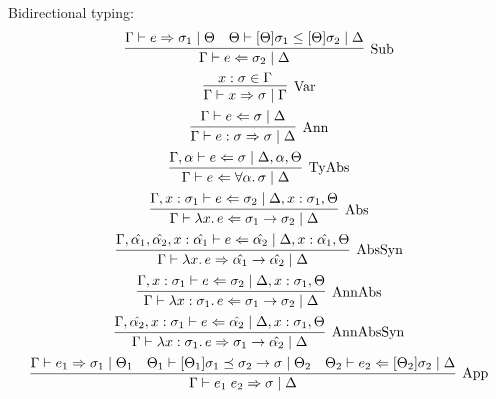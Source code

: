 Bidirectional typing:
\begin{gather*}
  \infer[\text{Sub}]{\Gamma \vdash e \Leftarrow \sigma_2 \mid \Delta}{
    \Gamma \vdash e \Rightarrow \sigma_1 \mid \Theta
    &
    \Theta \vdash [\Theta]\sigma_1 \leq [\Theta]\sigma_2 \mid \Delta
  }
  \\
  \infer[\text{Var}]{\Gamma \vdash x \Rightarrow \sigma \mid \Gamma}{
    x: \sigma \in \Gamma
  }
  \\
  \infer[\text{Ann}]{\Gamma \vdash e: \sigma \Rightarrow \sigma \mid \Delta}{
    \Gamma \vdash e \Leftarrow \sigma \mid \Delta
  }
  \\
  \infer[\text{TyAbs}]{\Gamma \vdash e \Leftarrow \forall \alpha\ldotp \sigma \mid \Delta}{
    \Gamma,\alpha \vdash e \Leftarrow \sigma \mid \Delta, \alpha, \Theta
  }
  \\
  \infer[\text{Abs}]{\Gamma \vdash \lambda x\ldotp e \Leftarrow \sigma_1 \to \sigma_2 \mid \Delta}{
    \Gamma, x: \sigma_1 \vdash e \Leftarrow \sigma_2 \mid \Delta, x: \sigma_1, \Theta
  }
  \\
  \infer[\text{AbsSyn}]{\Gamma \vdash \lambda x\ldotp e \Rightarrow \hat{\alpha_1} \to \hat{\alpha_2} \mid \Delta}{
    \Gamma, \hat{\alpha_1}, \hat{\alpha_2}, x: \hat{\alpha_1} \vdash e \Leftarrow \hat{\alpha_2} \mid \Delta, x: \hat{\alpha_1}, \Theta
  }
  \\
  \infer[\text{AnnAbs}]{\Gamma \vdash \lambda x: \sigma_1\ldotp e \Leftarrow \sigma_1 \to \sigma_2 \mid \Delta}{
    \Gamma, x: \sigma_1 \vdash e \Leftarrow \sigma_2 \mid \Delta, x: \sigma_1, \Theta
  }
  \\
  \infer[\text{AnnAbsSyn}]{\Gamma \vdash \lambda x: \sigma_1\ldotp e \Rightarrow \sigma_1 \to \hat{\alpha_2} \mid \Delta}{
    \Gamma, \hat{\alpha_2}, x: \sigma_1 \vdash e \Leftarrow \hat{\alpha_2} \mid \Delta, x: \sigma_1, \Theta
  }
  \\
  \infer[\text{App}]{\Gamma \vdash e_1\; e_2 \Rightarrow \sigma \mid \Delta}{
    \Gamma \vdash e_1 \Rightarrow \sigma_1 \mid \Theta_1
    &
    \Theta_1 \vdash [\Theta_1]\sigma_1 \preceq \sigma_2 \to \sigma \mid \Theta_2
    &
    \Theta_2 \vdash e_2 \Leftarrow [\Theta_2]\sigma_2 \mid \Delta
  }
\end{gather*}

